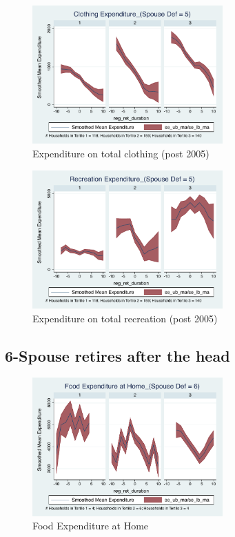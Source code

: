\documentclass[11pt,onecolumn]{article}
\numberwithin{figure}{section}
\begin{document}
\begin{figure}[h]
	\caption{Expenditure on total clothing (post 2005)}
	\centering
	\includegraphics[width=0.65\textwidth]{../ConsumptionPostRetirement_by_SpouseDef_Cats/Smoothed/5/spouse_def_total_clothing_2005_real.pdf}
\end{figure}

\begin{figure}[h]
	\caption{Expenditure on total recreation (post 2005)}
	\centering
	\includegraphics[width=0.65\textwidth]{../ConsumptionPostRetirement_by_SpouseDef_Cats/Smoothed/5/spouse_def_total_recreation_2005_real.pdf}
\end{figure}

\clearpage

\subsection{6-Spouse retires after the head}

\begin{figure}[h]
	\caption{Food Expenditure at Home}
	\centering
	\includegraphics[width=0.65\textwidth]{../ConsumptionPostRetirement_by_SpouseDef_Cats/Smoothed/6/spouse_def_total_foodexp_home_real.pdf}
\end{figure}
\end{document}
